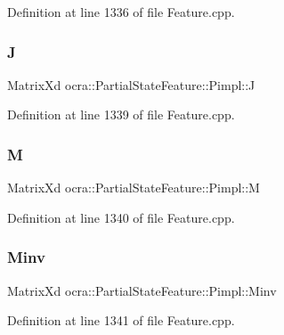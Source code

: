 Definition at line 1336 of file Feature.\+cpp.

\hypertarget{structocra_1_1PartialStateFeature_1_1Pimpl_aa1bea74398a6c6774e4178c9a07585fc}{}\label{structocra_1_1PartialStateFeature_1_1Pimpl_aa1bea74398a6c6774e4178c9a07585fc} 
\subsubsection{\texorpdfstring{J}{J}}
{\footnotesize\ttfamily Matrix\+Xd ocra\+::\+Partial\+State\+Feature\+::\+Pimpl\+::J}



Definition at line 1339 of file Feature.\+cpp.

\hypertarget{structocra_1_1PartialStateFeature_1_1Pimpl_a72c1103a7217a32b0c3a987ee55ae4b8}{}\label{structocra_1_1PartialStateFeature_1_1Pimpl_a72c1103a7217a32b0c3a987ee55ae4b8} 
\subsubsection{\texorpdfstring{M}{M}}
{\footnotesize\ttfamily Matrix\+Xd ocra\+::\+Partial\+State\+Feature\+::\+Pimpl\+::M}



Definition at line 1340 of file Feature.\+cpp.

\hypertarget{structocra_1_1PartialStateFeature_1_1Pimpl_a7e2b177fca112bbeb8055361c90d333e}{}\label{structocra_1_1PartialStateFeature_1_1Pimpl_a7e2b177fca112bbeb8055361c90d333e} 
\subsubsection{\texorpdfstring{Minv}{Minv}}
{\footnotesize\ttfamily Matrix\+Xd ocra\+::\+Partial\+State\+Feature\+::\+Pimpl\+::\+Minv}



Definition at line 1341 of file Feature.\+cpp.

